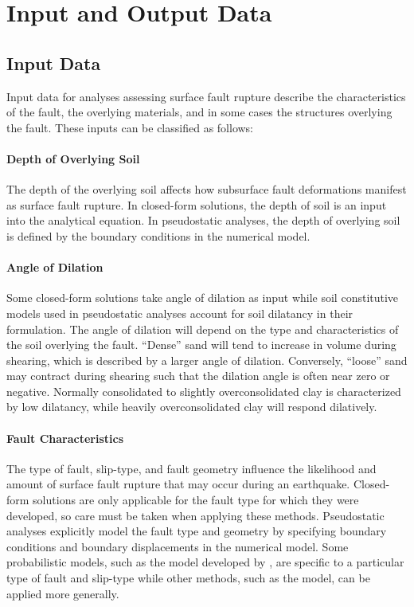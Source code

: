 \section{Input and Output Data}
\label{sec:eq_surface_rup_input_output}

\subsection{Input Data}

Input data for analyses assessing surface fault rupture describe the characteristics of the fault, the overlying materials, and in some cases the structures overlying the fault. These inputs can be classified as follows:

\paragraph{Depth of Overlying Soil}
The depth of the overlying soil affects how subsurface fault deformations manifest as surface fault rupture. In closed-form solutions, the depth of soil is an input into the analytical equation. In pseudostatic analyses, the depth of overlying soil is defined by the boundary conditions in the numerical model.

\paragraph{Angle of Dilation}
Some closed-form solutions take angle of dilation as input while soil constitutive models used in pseudostatic analyses account for soil dilatancy in their formulation. The angle of dilation will depend on the type and characteristics of the soil overlying the fault. ``Dense'' sand will tend to increase in volume during shearing, which is described by a larger angle of dilation. Conversely, ``loose'' sand may contract during shearing such that the dilation angle is often near zero or negative. Normally consolidated to slightly overconsolidated clay is characterized by low dilatancy, while heavily overconsolidated clay will respond dilatively.

\paragraph{Fault Characteristics}
The type of fault, slip-type, and fault geometry influence the likelihood and amount of surface fault rupture that may occur during an earthquake. Closed-form solutions are only applicable for the fault type for which they were developed, so care must be taken when applying these methods. Pseudostatic analyses explicitly model the fault type and geometry by specifying boundary conditions and boundary displacements in the numerical model. Some probabilistic models, such as the model developed by \cite{moss2011probabilistic}, are specific to a particular type of fault and slip-type while other methods, such as the \cite{hecker2013variability} model, can be applied more generally.

